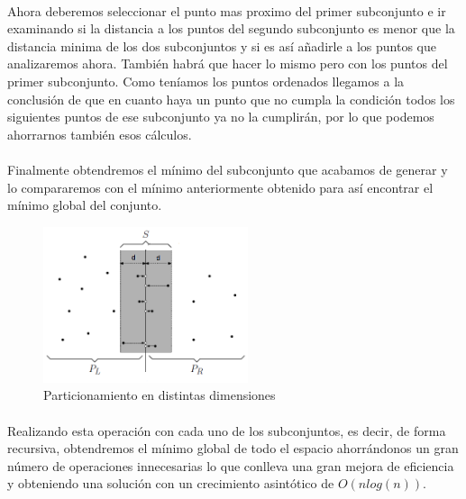 \documentclass{article}
\begin{document}
			\paragraph{}
			Ahora deberemos seleccionar el punto mas proximo del primer subconjunto e ir examinando si la distancia a los puntos del segundo subconjunto es menor que la distancia minima de los dos subconjuntos y si es así añadirle a los puntos que analizaremos ahora. También habrá que hacer lo mismo pero con los puntos del primer subconjunto. Como teníamos los puntos ordenados llegamos a la conclusión de que en cuanto haya un punto que no cumpla la condición todos los siguientes puntos de ese subconjunto ya no la cumplirán, por lo que podemos ahorrarnos también esos cálculos.
			\paragraph{}
			Finalmente obtendremos el mínimo del subconjunto que acabamos de generar y lo compararemos con el mínimo anteriormente obtenido para así encontrar el mínimo global del conjunto.

			\begin{figure}[ht!]
				\centering
				\includegraphics[width=60mm]{strip_closesr1.png}
				\caption{Particionamiento en distintas dimensiones \label{example_border}}
			\end{figure}


	\paragraph{}
	Realizando esta operación con cada uno de los subconjuntos, es decir, de forma recursiva,  obtendremos el mínimo global de todo el espacio ahorrándonos un gran número de operaciones innecesarias lo que conlleva una gran mejora de eficiencia y obteniendo una solución con un crecimiento asintótico de $O(nlog(n))$.
\end{document}
